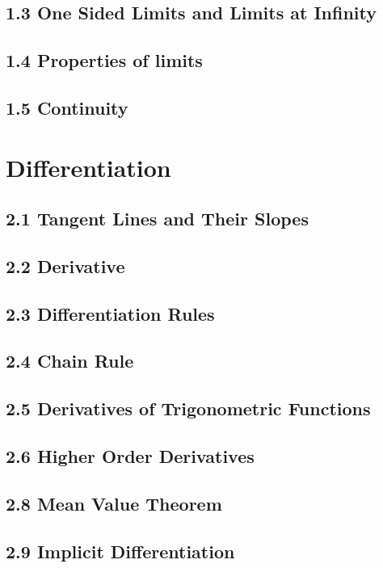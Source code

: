 \documentclass[12pt]{memoir}
\begin{document}
    \section*{1.3 One Sided Limits and Limits at Infinity}
    
    \section*{1.4 Properties of limits}
    
    \section*{1.5 Continuity}
    


\chapter*{Differentiation}
    \section*{2.1 Tangent Lines and Their Slopes}
    
    \section*{2.2 Derivative}
    
    \section*{2.3 Differentiation Rules}
    
    \section*{2.4 Chain Rule}
    
    \section*{2.5 Derivatives of Trigonometric Functions}
    
    \section*{2.6 Higher Order Derivatives}
    
    \section*{2.8 Mean Value Theorem}
    
    \section*{2.9 Implicit Differentiation}
    
\end{document}
